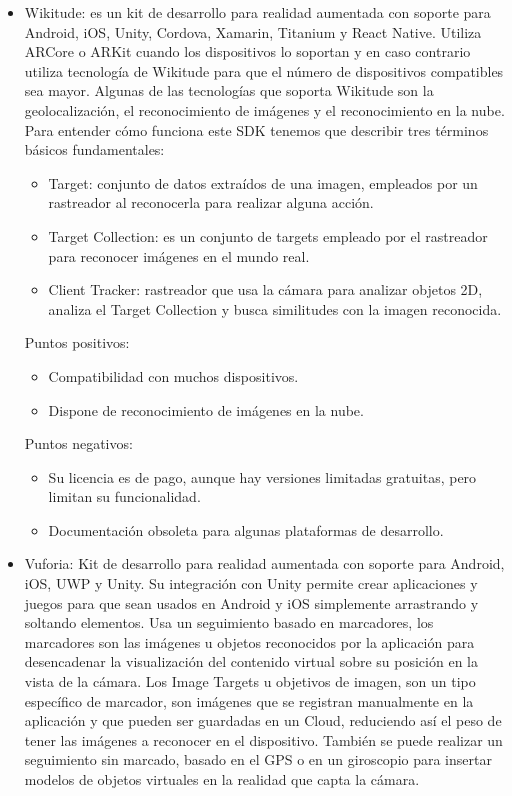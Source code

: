 \begin{itemize}
    \item Wikitude\cite{wikitude}:
    es un kit de desarrollo para realidad aumentada con soporte para Android,
    iOS, Unity, Cordova, Xamarin, Titanium y React Native.
    Utiliza ARCore o ARKit cuando los dispositivos lo soportan y en caso
    contrario utiliza tecnología de Wikitude para que el número de dispositivos
    compatibles sea mayor. Algunas de las tecnologías que soporta Wikitude son
    la geolocalización, el reconocimiento de imágenes y el reconocimiento en la
    nube. Para entender cómo funciona este SDK tenemos que describir tres
    términos básicos fundamentales:
    \begin{itemize}
        \item Target: conjunto de datos extraídos de una imagen, empleados por
        un rastreador al reconocerla para realizar alguna acción.
        \item Target Collection: es un conjunto de targets empleado por el
        rastreador para reconocer imágenes en el mundo real.
        \item Client Tracker: rastreador que usa la cámara para analizar objetos
        2D, analiza el Target Collection y busca similitudes con la imagen
        reconocida.
    \end{itemize}

    Puntos positivos:
    \begin{itemize}
        \item Compatibilidad con muchos dispositivos.
        \item Dispone de reconocimiento de imágenes en la nube.
    \end{itemize}
    Puntos negativos:
    \begin{itemize}
        \item Su licencia es de pago, aunque hay versiones limitadas gratuitas,
        pero limitan su funcionalidad.
        \item Documentación obsoleta para algunas plataformas de desarrollo.
    \end{itemize}


    \item Vuforia\cite{vuforia}:
    Kit de desarrollo para realidad aumentada con soporte para Android, iOS,
    UWP y Unity.
    Su integración con Unity permite crear aplicaciones y juegos 
    para que sean usados en Android y iOS simplemente arrastrando y soltando
    elementos. Usa un seguimiento basado en marcadores, los marcadores son las
    imágenes u objetos reconocidos por la aplicación para desencadenar la
    visualización del contenido virtual sobre su posición en la vista de la
    cámara.
    Los Image Targets u objetivos de imagen, son un tipo específico de marcador,
    son imágenes que se registran manualmente en la aplicación y que pueden ser
    guardadas en un Cloud, reduciendo así el peso de tener las imágenes a
    reconocer en el dispositivo.
    También se puede realizar un seguimiento sin marcado, basado en el GPS o en
    un giroscopio para insertar modelos de objetos virtuales en la realidad que
    capta la cámara.


\end{itemize}
